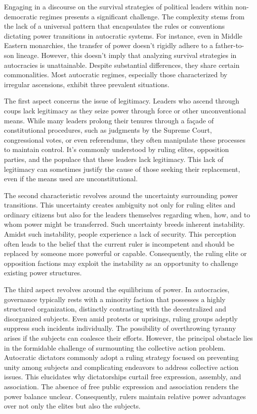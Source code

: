 \documentclass[
  12pt,
  a4paper,
  12pt]{article}
\begin{document}
Engaging in a discourse on the survival strategies of political leaders
within non-democratic regimes presents a significant challenge. The
complexity stems from the lack of a universal pattern that encapsulates
the rules or conventions dictating power transitions in autocratic
systems. For instance, even in Middle Eastern monarchies, the transfer
of power doesn't rigidly adhere to a father-to-son lineage. However,
this doesn't imply that analyzing survival strategies in autocracies is
unattainable. Despite substantial differences, they share certain
commonalities. Most autocratic regimes, especially those characterized
by irregular ascensions, exhibit three prevalent situations.

The first aspect concerns the issue of legitimacy. Leaders who ascend
through coups lack legitimacy as they seize power through force or other
unconventional means. While many leaders prolong their tenures through a
façade of constitutional procedures, such as judgments by the Supreme
Court, congressional votes, or even referendums, they often manipulate
these processes to maintain control. It's commonly understood by ruling
elites, opposition parties, and the populace that these leaders lack
legitimacy. This lack of legitimacy can sometimes justify the cause of
those seeking their replacement, even if the means used are
unconstitutional.

The second characteristic revolves around the uncertainty surrounding
power transitions. This uncertainty creates ambiguity not only for
ruling elites and ordinary citizens but also for the leaders themselves
regarding when, how, and to whom power might be transferred. Such
uncertainty breeds inherent instability. Amidst such instability, people
experience a lack of security. This perception often leads to the belief
that the current ruler is incompetent and should be replaced by someone
more powerful or capable. Consequently, the ruling elite or opposition
factions may exploit the instability as an opportunity to challenge
existing power structures.

The third aspect revolves around the equilibrium of power. In
autocracies, governance typically rests with a minority faction that
possesses a highly structured organization, distinctly contrasting with
the decentralized and disorganized subjects. Even amid protests or
uprisings, ruling groups adeptly suppress such incidents individually.
The possibility of overthrowing tyranny arises if the subjects can
coalesce their efforts. However, the principal obstacle lies in the
formidable challenge of surmounting the collective action problem.
Autocratic dictators commonly adopt a ruling strategy focused on
preventing unity among subjects and complicating endeavors to address
collective action issues. This elucidates why dictatorships curtail free
expression, assembly, and association. The absence of free public
expression and association renders the power balance unclear.
Consequently, rulers maintain relative power advantages over not only
the elites but also the subjects.
\end{document}

